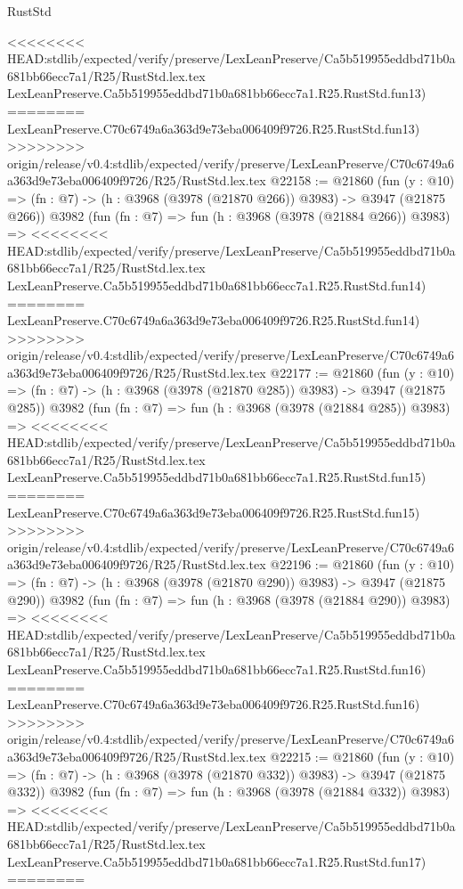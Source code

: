 \begin{lexlean}{RustStd}
\begin{coremodule}
{\begin{coremodule}
{{{{{{{{{{{{{{{{{{{{{{{{{{{{{{{{{{{{{{<<<<<<<< HEAD:stdlib/expected/verify/preserve/LexLeanPreserve/Ca5b519955eddbd71b0a681bb66ecc7a1/R25/RustStd.lex.tex
    LexLeanPreserve.Ca5b519955eddbd71b0a681bb66ecc7a1.R25.RustStd.fun13)
========
    LexLeanPreserve.C70c6749a6a363d9e73eba006409f9726.R25.RustStd.fun13)
>>>>>>>> origin/release/v0.4:stdlib/expected/verify/preserve/LexLeanPreserve/C70c6749a6a363d9e73eba006409f9726/R25/RustStd.lex.tex
@22158 := @21860
    (fun (y : @10) => (fn : @7) -> (h : @3968 (@3978 (@21870 @266)) @3983) -> @3947 (@21875 @266))
    @3982
    (fun (fn : @7) =>
    fun (h : @3968 (@3978 (@21884 @266)) @3983) =>
<<<<<<<< HEAD:stdlib/expected/verify/preserve/LexLeanPreserve/Ca5b519955eddbd71b0a681bb66ecc7a1/R25/RustStd.lex.tex
    LexLeanPreserve.Ca5b519955eddbd71b0a681bb66ecc7a1.R25.RustStd.fun14)
========
    LexLeanPreserve.C70c6749a6a363d9e73eba006409f9726.R25.RustStd.fun14)
>>>>>>>> origin/release/v0.4:stdlib/expected/verify/preserve/LexLeanPreserve/C70c6749a6a363d9e73eba006409f9726/R25/RustStd.lex.tex
@22177 := @21860
    (fun (y : @10) => (fn : @7) -> (h : @3968 (@3978 (@21870 @285)) @3983) -> @3947 (@21875 @285))
    @3982
    (fun (fn : @7) =>
    fun (h : @3968 (@3978 (@21884 @285)) @3983) =>
<<<<<<<< HEAD:stdlib/expected/verify/preserve/LexLeanPreserve/Ca5b519955eddbd71b0a681bb66ecc7a1/R25/RustStd.lex.tex
    LexLeanPreserve.Ca5b519955eddbd71b0a681bb66ecc7a1.R25.RustStd.fun15)
========
    LexLeanPreserve.C70c6749a6a363d9e73eba006409f9726.R25.RustStd.fun15)
>>>>>>>> origin/release/v0.4:stdlib/expected/verify/preserve/LexLeanPreserve/C70c6749a6a363d9e73eba006409f9726/R25/RustStd.lex.tex
@22196 := @21860
    (fun (y : @10) => (fn : @7) -> (h : @3968 (@3978 (@21870 @290)) @3983) -> @3947 (@21875 @290))
    @3982
    (fun (fn : @7) =>
    fun (h : @3968 (@3978 (@21884 @290)) @3983) =>
<<<<<<<< HEAD:stdlib/expected/verify/preserve/LexLeanPreserve/Ca5b519955eddbd71b0a681bb66ecc7a1/R25/RustStd.lex.tex
    LexLeanPreserve.Ca5b519955eddbd71b0a681bb66ecc7a1.R25.RustStd.fun16)
========
    LexLeanPreserve.C70c6749a6a363d9e73eba006409f9726.R25.RustStd.fun16)
>>>>>>>> origin/release/v0.4:stdlib/expected/verify/preserve/LexLeanPreserve/C70c6749a6a363d9e73eba006409f9726/R25/RustStd.lex.tex
@22215 := @21860
    (fun (y : @10) => (fn : @7) -> (h : @3968 (@3978 (@21870 @332)) @3983) -> @3947 (@21875 @332))
    @3982
    (fun (fn : @7) =>
    fun (h : @3968 (@3978 (@21884 @332)) @3983) =>
<<<<<<<< HEAD:stdlib/expected/verify/preserve/LexLeanPreserve/Ca5b519955eddbd71b0a681bb66ecc7a1/R25/RustStd.lex.tex
    LexLeanPreserve.Ca5b519955eddbd71b0a681bb66ecc7a1.R25.RustStd.fun17)
========
}}}}}}}}}}}}}}}}}}}}}}}}}}}}}}}}}}}}}}
\end{coremodule}}
\end{coremodule}
\end{lexlean}
